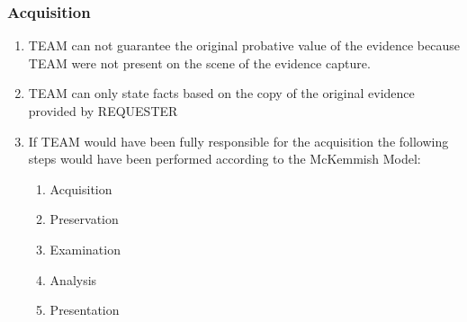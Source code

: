 \subsubsection{Acquisition}
\begin{enumerate}
\item TEAM can not guarantee the original probative value of the evidence because TEAM were not present on the scene of
	the evidence capture.
\item TEAM can only state facts based on the copy of the original evidence provided by REQUESTER
\item If TEAM would have been fully responsible for the acquisition the following steps would have been
	performed according to the McKemmish Model:
	\begin{enumerate}[label=\alph*]
		\item Acquisition
		\item Preservation
		\item Examination
		\item Analysis
		\item Presentation
	\end{enumerate}
\end{enumerate}
